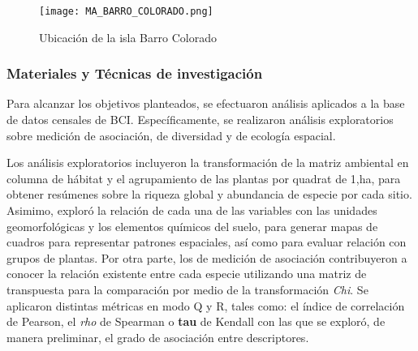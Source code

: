 \documentclass[11pt,]{article}
\begin{document}
\begin{figure}
\centering
\texttt{[image: MA\_BARRO\_COLORADO.png]}
\caption{Ubicación de la isla Barro Colorado\label{mapa}}
\end{figure}

\subsubsection{Materiales y Técnicas de
investigación}\label{materiales-y-tuxe9cnicas-de-investigaciuxf3n}

Para alcanzar los objetivos planteados, se efectuaron análisis aplicados
a la base de datos censales de BCI. Específicamente, se realizaron
análisis exploratorios sobre medición de asociación, de diversidad y de
ecología espacial.

Los análisis exploratorios incluyeron la transformación de la matriz
ambiental en columna de hábitat y el agrupamiento de las plantas por
quadrat de 1,ha, para obtener resúmenes sobre la riqueza global y
abundancia de especie por cada sitio. Asimimo, exploró la relación de
cada una de las variables con las unidades geomorfológicas y los
elementos químicos del suelo, para generar mapas de cuadros para
representar patrones espaciales, así como para evaluar relación con
grupos de plantas. Por otra parte, los de medición de asociación
contribuyeron a conocer la relación existente entre cada especie
utilizando una matriz de transpuesta para la comparación por medio de la
transformación \emph{Chi}. Se aplicaron distintas métricas en modo Q y
R, tales como: el índice de correlación de Pearson, el \emph{rho} de
Spearman o \textbf{tau} de Kendall con las que se exploró, de manera
preliminar, el grado de asociación entre descriptores.
\end{document}
